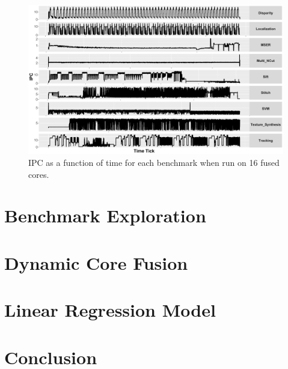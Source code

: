 \begin{figure}
    \centering
    \includegraphics[width=1\textwidth]{cases-paper/graphics/Exploration/ipcs_16_2.pdf}
    \caption{IPC as a function of time for each benchmark when run on 16 fused cores.}
    \label{fig:sxt}
\end{figure}


\section{Benchmark Exploration}\label{sec:expl}


\section{Dynamic Core Fusion}\label{sec:dynamic}



\section{Linear Regression Model}\label{sec:model}


%

\section{Conclusion}\label{sec:conc}
